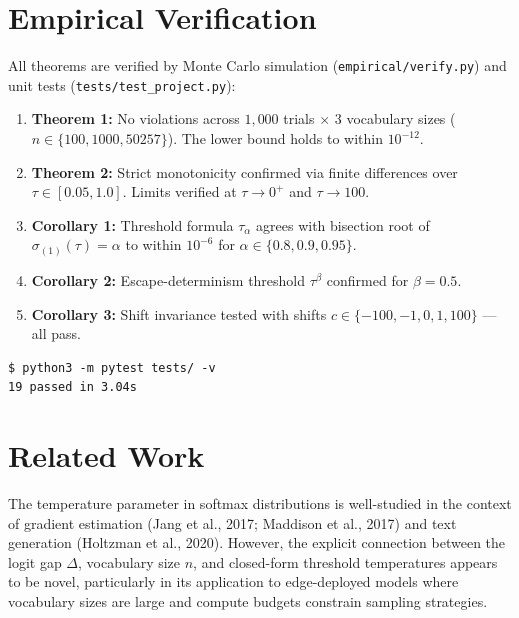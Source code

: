 \documentclass[11pt,a4paper]{article}
\theoremstyle{definition}
\newcommand{\softmax}{\sigma}
\newcommand{\temp}{\tau}
\newcommand{\gap}{\Delta}
\begin{document}
\section{Empirical Verification}

All theorems are verified by Monte Carlo simulation (\texttt{empirical/verify.py}) and unit tests (\texttt{tests/test\_project.py}):

\begin{enumerate}[noitemsep]
  \item \textbf{Theorem 1:} No violations across $1{,}000$ trials $\times$ 3 vocabulary sizes ($n \in \{100, 1000, 50257\}$). The lower bound holds to within $10^{-12}$.
  \item \textbf{Theorem 2:} Strict monotonicity confirmed via finite differences over $\temp \in [0.05, 1.0]$. Limits verified at $\temp \to 0^+$ and $\temp \to 100$.
  \item \textbf{Corollary 1:} Threshold formula $\temp_\alpha$ agrees with bisection root of $\softmax_{(1)}(\temp) = \alpha$ to within $10^{-6}$ for $\alpha \in \{0.8, 0.9, 0.95\}$.
  \item \textbf{Corollary 2:} Escape-determinism threshold $\temp^\beta$ confirmed for $\beta = 0.5$.
  \item \textbf{Corollary 3:} Shift invariance tested with shifts $c \in \{-100, -1, 0, 1, 100\}$ — all pass.
\end{enumerate}

\begin{verbatim}
$ python3 -m pytest tests/ -v
19 passed in 3.04s
\end{verbatim}

\section{Related Work}

The temperature parameter in softmax distributions is well-studied in the context of gradient estimation (Jang et al., 2017; Maddison et al., 2017) and text generation (Holtzman et al., 2020). However, the explicit connection between the logit gap $\gap$, vocabulary size $n$, and closed-form threshold temperatures appears to be novel, particularly in its application to edge-deployed models where vocabulary sizes are large and compute budgets constrain sampling strategies.
\end{document}
